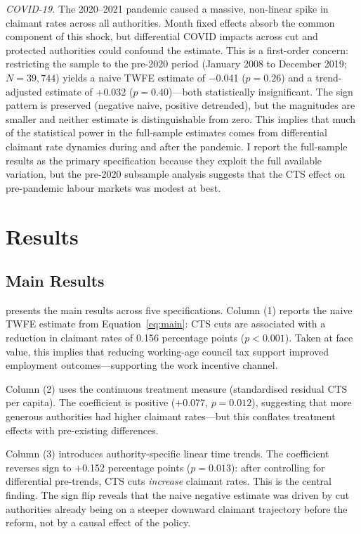 \documentclass[12pt]{article}
\begin{document}
\emph{COVID-19.} The 2020--2021 pandemic caused a massive, non-linear spike in claimant rates across all authorities. Month fixed effects absorb the common component of this shock, but differential COVID impacts across cut and protected authorities could confound the estimate. This is a first-order concern: restricting the sample to the pre-2020 period (January 2008 to December 2019; $N = 39{,}744$) yields a naive TWFE estimate of $-$0.041 ($p = 0.26$) and a trend-adjusted estimate of $+$0.032 ($p = 0.40$)---both statistically insignificant. The sign pattern is preserved (negative naive, positive detrended), but the magnitudes are smaller and neither estimate is distinguishable from zero. This implies that much of the statistical power in the full-sample estimates comes from differential claimant rate dynamics during and after the pandemic. I report the full-sample results as the primary specification because they exploit the full available variation, but the pre-2020 subsample analysis suggests that the CTS effect on pre-pandemic labour markets was modest at best.


\section{Results}

\subsection{Main Results}

 presents the main results across five specifications. Column (1) reports the naive TWFE estimate from Equation~\ref{eq:main}: CTS cuts are associated with a reduction in claimant rates of 0.156 percentage points ($p < 0.001$). Taken at face value, this implies that reducing working-age council tax support improved employment outcomes---supporting the work incentive channel.

Column (2) uses the continuous treatment measure (standardised residual CTS per capita). The coefficient is positive ($+$0.077, $p = 0.012$), suggesting that more generous authorities had higher claimant rates---but this conflates treatment effects with pre-existing differences.

Column (3) introduces authority-specific linear time trends. The coefficient reverses sign to $+$0.152 percentage points ($p = 0.013$): after controlling for differential pre-trends, CTS cuts \emph{increase} claimant rates. This is the central finding. The sign flip reveals that the naive negative estimate was driven by cut authorities already being on a steeper downward claimant trajectory before the reform, not by a causal effect of the policy.
\end{document}
